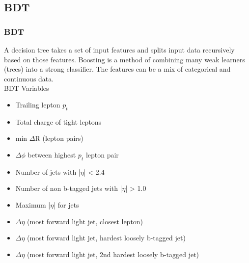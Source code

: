 \documentclass[11pt]{beamer}
\begin{document}
\begin{frame}
\subsection{BDT}
\frametitle{BDT}
\small{
	A decision tree takes a set of input features and splits input data recursively based on
	those features.
	Boosting is a method of combining many weak learners (trees) into a strong classifier. The features can be a mix of categorical and continuous data.\\
	\vspace{10px}
	BDT Variables}
\tiny{
	\begin{itemize}
		\item	Trailing lepton $p_{t}$
		\item 	Total charge of tight leptons
		\item 	min $\Delta$R (lepton pairs)
		\item 	$\Delta\phi$ between highest $p_t$ lepton pair
		\item 	Number of jets with |$\eta$| < 2.4
		\item	Number of non b-tagged jets with |$\eta$| > 1.0
		\item	Maximum |$\eta$| for jets
		\item	$\Delta\eta$ (most forward light jet, closest lepton)
		\item	$\Delta\eta$ (most forward light jet, hardest loosely b-tagged jet)
		\item	$\Delta\eta$ (most forward light jet, 2nd hardest loosely b-tagged jet)
\end{itemize} }
\end{frame}
\end{document}
